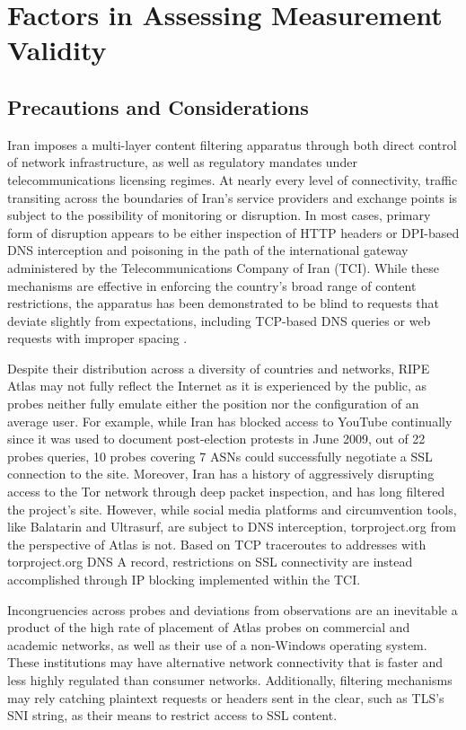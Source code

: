 \section{Factors in Assessing Measurement Validity}

\subsection{Precautions and Considerations}

Iran imposes a multi-layer content filtering apparatus through both direct control of network infrastructure, as well as regulatory mandates under telecommunications licensing regimes. At nearly every level of connectivity, traffic transiting across the boundaries of Iran's service providers and exchange points is subject to the possibility of monitoring or disruption. In most cases, primary form of disruption appears to be either inspection of HTTP headers or DPI-based DNS interception and poisoning  in the path of the international gateway administered by the Telecommunications Company of Iran (TCI). While these mechanisms are effective in enforcing the country's broad range of content restrictions, the apparatus has been demonstrated to be blind to requests that deviate slightly from expectations, including TCP-based DNS queries or web requests with improper spacing \cite{aryan2013internet}.

Despite their distribution across a diversity of countries and networks, RIPE Atlas may not fully reflect the Internet as it is experienced by the public, as probes neither fully emulate either the position nor the configuration of an average user. For example, while Iran has blocked access to YouTube continually since it was used to document post-election protests in June 2009, out of 22 probes queries, 10 probes covering 7 ASNs could successfully negotiate a SSL connection to the site. Moreover, Iran has a history of aggressively disrupting access to the Tor network through deep packet inspection, and has long filtered the project's site. However, while social media platforms and circumvention tools, like Balatarin and Ultrasurf, are subject to DNS interception, torproject.org from the perspective of Atlas is not. Based on TCP traceroutes to addresses with torproject.org DNS A record, restrictions on SSL connectivity are instead accomplished through IP blocking implemented within the TCI.

Incongruencies across probes and deviations from observations are an inevitable a product of the high rate of placement of Atlas probes on commercial and academic networks, as well as their use of a non-Windows operating system. These institutions may have alternative network connectivity that is faster and less highly regulated than consumer networks. Additionally, filtering mechanisms may rely catching plaintext requests or headers sent in the clear, such as TLS's SNI string, as their means to restrict access to SSL content. 

